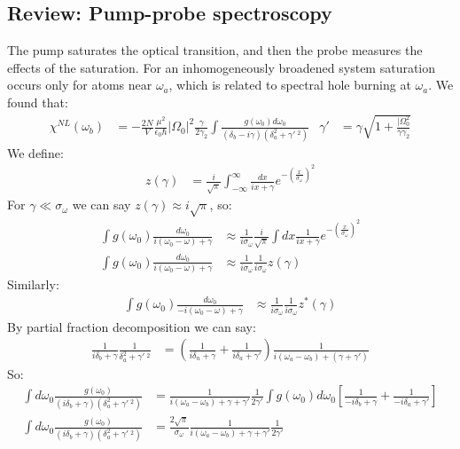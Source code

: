 \subsection*{Review: Pump-probe spectroscopy}
The pump saturates the optical transition, and then the probe measures the effects of the saturation.
For an inhomogeneously broadened system saturation occurs only for atoms near $\omega_a$, which is related to spectral hole burning at $\omega_a$. 
We found that:
\begin{align*}
	\chi^{NL}(\omega_b) &= - \frac{2N}{V} \frac{\mu^2}{\epsilon_0\hbar} |\Omega_0|^2 \frac{\gamma}{2\gamma_2} \int \frac{g(\omega_0) d\omega_0}{(\delta_b - i\gamma)(\delta_a^2 + \gamma'\ ^2)} &
	\gamma' &= \gamma\sqrt{1 + \frac{|\Omega_0^2}{\gamma\gamma_2}}
\end{align*}
We define:
\begin{align*}
	z(\gamma) &= \frac{i}{\sqrt{\pi}} \int_{-\infty}^\infty \frac{dx}{ix + \gamma} e^{-\left(\frac{x}{\sigma_\omega}\right)^2}
\end{align*}
For $\gamma \ll \sigma_\omega$ we can say $z(\gamma) \approx i\sqrt{\pi}$, so:
\begin{align*}
	\int g(\omega_0) \frac{d\omega_0}{i(\omega_0 -\omega) + \gamma} &\approx \frac{1}{i\sigma_\omega} \frac{i}{\sqrt{\pi}} \int dx \frac{1}{ix + \gamma} e ^{-\left(\frac{x}{\sigma_\omega}\right)^2} \\
	\int g(\omega_0) \frac{d\omega_0}{i(\omega_0 -\omega) + \gamma} &\approx \frac{1}{i\sigma_\omega} \frac{1}{i\sigma_\omega} z(\gamma)
\end{align*}
Similarly:
\begin{align*}
	\int g(\omega_0) \frac{d\omega_0}{-i(\omega_0 -\omega) + \gamma} &\approx \frac{1}{i\sigma_\omega} \frac{1}{i\sigma_\omega} z^*(\gamma)
\end{align*}
By partial fraction decomposition we can say:
\begin{align*}
	\frac{1}{i\delta_b + \gamma} \frac{1}{\delta_a^2 + \gamma'\ ^2} &= \left( \frac{1}{i\delta_n + \gamma} + \frac{1}{i\delta_a + \gamma'}\right)\frac{1}{i(\omega_a - \omega_b) + (\gamma + \gamma')}
\end{align*}
So:
\begin{align*}
	\int d\omega_0 \frac{g(\omega_0)}{(i\delta_b + \gamma)(\delta_a^2 + \gamma'\ ^2)} &= \frac{1}{i(\omega_a - \omega_b) + \gamma + \gamma'} \frac{1}{2\gamma'} \int g(\omega_0)d\omega_0\left[\frac{1}{-i\delta_b + \gamma} + \frac{1}{-i\delta_a + \gamma'}\right] \\
	\int d\omega_0 \frac{g(\omega_0)}{(i\delta_b + \gamma)(\delta_a^2 + \gamma'\ ^2)} &= \frac{2\sqrt{\pi}}{\sigma_\omega} \frac{1}{i(\omega_a -\omega_b) + \gamma + \gamma'} \frac{1}{2\gamma'}
\end{align*}
